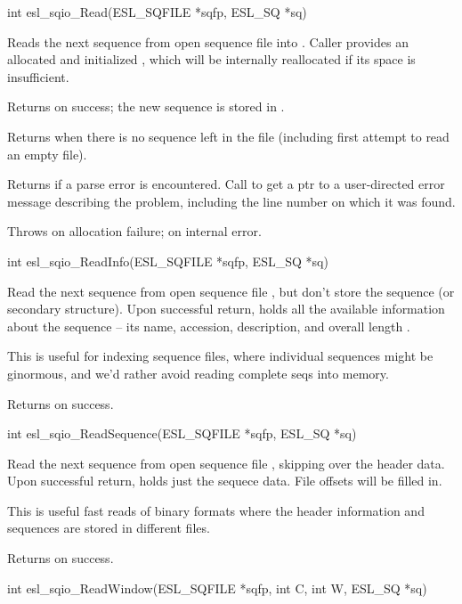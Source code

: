 \begin{sreapi}
\hypertarget{func:esl_sqio_Read()}
{\item[int esl\_sqio\_Read(ESL\_SQFILE *sqfp, ESL\_SQ *sq)]}

Reads the next sequence from open sequence file  into 
. Caller provides an allocated and initialized , which
will be internally reallocated if its space is insufficient.

Returns  on success; the new sequence is stored in .

Returns  when there is no sequence left in the
file (including first attempt to read an empty file).

Returns  if a parse error is encountered.
Call  to get a ptr to a
user-directed error message describing the problem,
including the line number on which it was found.

Throws  on allocation failure;
 on internal error.


\hypertarget{func:esl_sqio_ReadInfo()}
{\item[int esl\_sqio\_ReadInfo(ESL\_SQFILE *sqfp, ESL\_SQ *sq)]}

Read the next sequence from open sequence file ,
but don't store the sequence (or secondary structure).
Upon successful return,  holds all the available 
information about the sequence -- its name, accession,
description, and overall length . 

This is useful for indexing sequence files, where
individual sequences might be ginormous, and we'd rather
avoid reading complete seqs into memory.

Returns  on success.


\hypertarget{func:esl_sqio_ReadSequence()}
{\item[int esl\_sqio\_ReadSequence(ESL\_SQFILE *sqfp, ESL\_SQ *sq)]}

Read the next sequence from open sequence file ,
skipping over the header data.  Upon successful return, 
 holds just the sequece data.  File offsets will be
filled in.

This is useful fast reads of binary formats where the
header information and sequences are stored in different
files.

Returns  on success.


\hypertarget{func:esl_sqio_ReadWindow()}
{\item[int esl\_sqio\_ReadWindow(ESL\_SQFILE *sqfp, int C, int W, ESL\_SQ *sq)]}


\end{sreapi}
